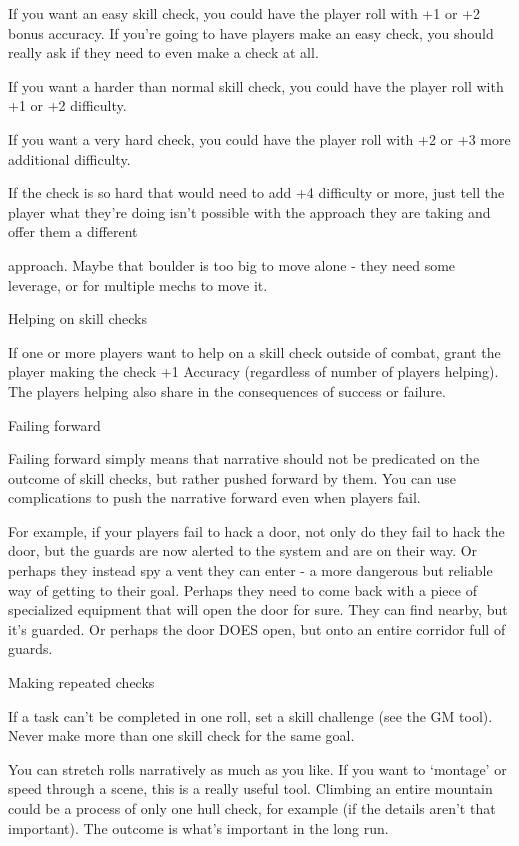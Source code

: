 If you want an easy skill check, you could have the player roll with +1 or +2 bonus accuracy. If
you’re going to have players make an easy check, you should really ask if they need to even
make a check at all.

If you want a harder than normal skill check, you could have the player roll with +1 or +2
difficulty.

If you want a very hard check, you could have the player roll with +2 or +3 more additional
difficulty.


If the check is so hard that would need to add +4 difficulty or more, just tell the player what
they’re doing isn’t possible with the approach they are taking and offer them a different




approach. Maybe that boulder is too big to move alone - they need some leverage, or for
multiple mechs to move it.


                                          Helping on skill checks


If one or more players want to help on a skill check outside of combat, grant the player making
the check +1 Accuracy (regardless of number of players helping). The players helping also share
in the consequences of success or failure.


                                              Failing forward


Failing forward simply means that narrative should not be predicated on the outcome of skill
checks, but rather pushed forward by them. You can use complications to push the narrative
forward even when players fail.

For example, if your players fail to hack a door, not only do they fail to hack the door, but the
guards are now alerted to the system and are on their way. Or perhaps they instead spy a vent
they can enter - a more dangerous but reliable way of getting to their goal. Perhaps they need to
come back with a piece of specialized equipment that will open the door for sure. They can find
nearby, but it’s guarded. Or perhaps the door DOES open, but onto an entire corridor full of
guards.


                                         Making repeated checks

If a task can’t be completed in one roll, set a skill challenge (see the GM tool). Never make more
than one skill check for the same goal.


You can stretch rolls narratively as much as you like. If you want to ‘montage’ or speed through a
scene, this is a really useful tool. Climbing an entire mountain could be a process of only one hull
check, for example (if the details aren’t that important). The outcome is what’s important in the
long run.


